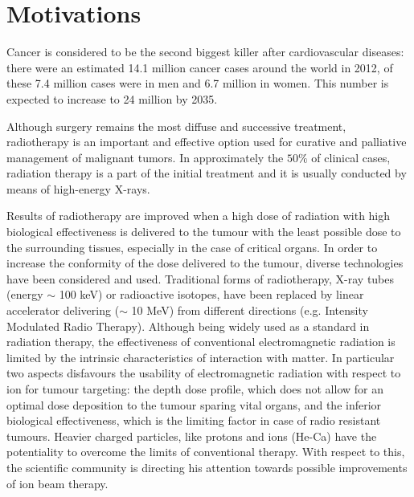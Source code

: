 \chapter{Motivations}

Cancer is considered to be the second biggest killer after cardiovascular diseases: there were an estimated 14.1 million cancer cases around the world in 2012, of these 7.4 million cases were in men and 6.7 million in women. This number is expected to increase to 24 million by 2035\cite{Ferlay2012}.

Although surgery remains the most diffuse and successive treatment, radiotherapy is an important and effective option used for curative and palliative management of malignant tumors.
In approximately the $50\%$ of clinical cases, radiation therapy is a part of the initial treatment and it is usually conducted by means of high-energy X-rays\cite{Durante2010}.

Results of radiotherapy are improved when a high dose of radiation with high biological effectiveness is delivered to the tumour with the least possible dose to the surrounding tissues, especially in the case of critical organs\cite{Linz2011}.
In order to increase the conformity of the dose delivered to the tumour, diverse technologies have been considered and used.
Traditional forms of radiotherapy, X-ray tubes (energy $\sim$ 100 keV) or radioactive isotopes, have been replaced by linear accelerator delivering ($\sim$ 10 MeV) from different directions (e.g. Intensity Modulated Radio Therapy).
Although being widely used as a standard in radiation therapy, the effectiveness of conventional electromagnetic radiation is limited by the intrinsic characteristics of interaction with matter.
In particular two aspects disfavours the usability of electromagnetic radiation with respect to ion for tumour targeting: the depth dose profile, which does not allow for an optimal dose deposition to the tumour sparing vital organs,
and the inferior biological effectiveness, which is the limiting factor in case of radio resistant tumours.
Heavier charged particles, like protons and ions (He-Ca) have the potentiality to overcome the limits of conventional therapy. With respect to this, the scientific community is directing his attention towards possible improvements of ion beam therapy\cite{Amaldi2011}.

